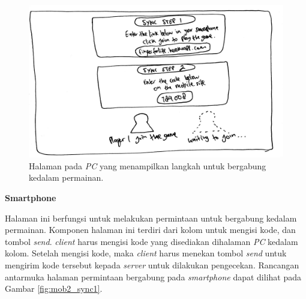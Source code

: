 \begin{enumerate}
\begin{figure}[H]
	\centering
	\includegraphics[scale=0.1]{Gambar/web2_sync}
	\caption{Halaman pada \textit{PC} yang menampilkan langkah untuk bergabung kedalam permainan.}
	\label{fig:web2_sync}
\end{figure}

	\textbf{Smartphone}
	
	Halaman ini berfungsi untuk melakukan permintaan untuk bergabung kedalam permainan. Komponen halaman ini terdiri dari kolom untuk mengisi kode, dan tombol \textit{send}. \textit{client} harus mengisi kode yang disediakan dihalaman \textit{PC} kedalam kolom. Setelah mengisi kode, maka \textit{client} harus menekan tombol \textit{send} untuk mengirim kode tersebut kepada \textit{server} untuk dilakukan pengecekan. Rancangan antarmuka halaman permintaan bergabung pada \textit{smartphone} dapat dilihat pada Gambar \ref{fig:mob2_sync1}.
	

\end{enumerate}
